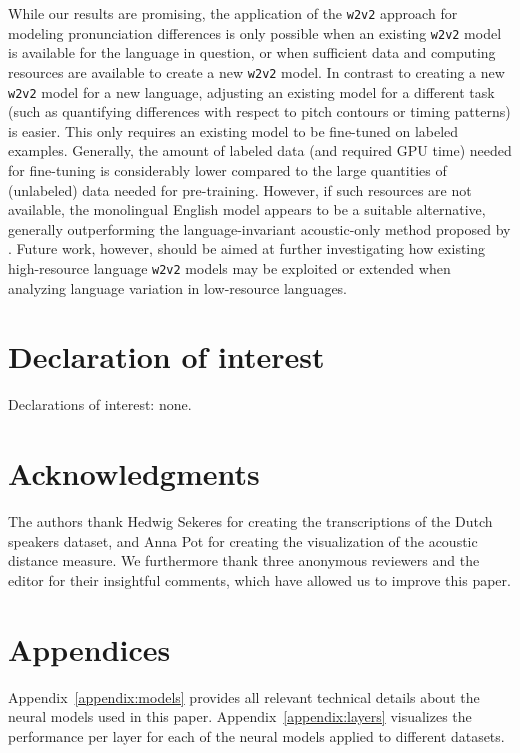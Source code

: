 \documentclass[11pt,a4paper]{article}
\begin{document}
While our results are promising, the application of the \texttt{w2v2} approach for modeling pronunciation differences is only possible when an existing \texttt{w2v2} model is available for the language in question, or when sufficient data and computing resources are available to create a new \texttt{w2v2} model. In contrast to creating a new \texttt{w2v2} model for a new language, adjusting an existing model for a different task (such as quantifying differences with respect to pitch contours or timing patterns) is easier. This only requires an existing model to be fine-tuned on labeled examples. Generally, the amount of labeled data (and required GPU time) needed for fine-tuning is considerably lower compared to the large quantities of (unlabeled) data needed for pre-training. However, if such resources are not available, the monolingual English model appears to be a suitable alternative, generally outperforming the language-invariant acoustic-only method proposed by \citet{acoustic-measure}. Future work, however, should be aimed at further investigating how existing high-resource language \texttt{w2v2} models may be exploited or extended when analyzing language variation in low-resource languages.

\section*{Declaration of interest}
Declarations of interest: none.

\section*{Acknowledgments}
The authors thank Hedwig Sekeres for creating the transcriptions of the Dutch speakers dataset, and Anna Pot for creating the visualization of the acoustic distance measure.  We furthermore thank three anonymous reviewers and the editor for their insightful comments, which have allowed us to improve this paper.

\newpage



\appendix
\section{Appendices}
\label{sec:appendix}
Appendix~\ref{appendix:models} provides all relevant technical details about the neural models used in this paper. Appendix~\ref{appendix:layers} visualizes the performance per layer for each of the neural models applied to different datasets. 
\end{document}
